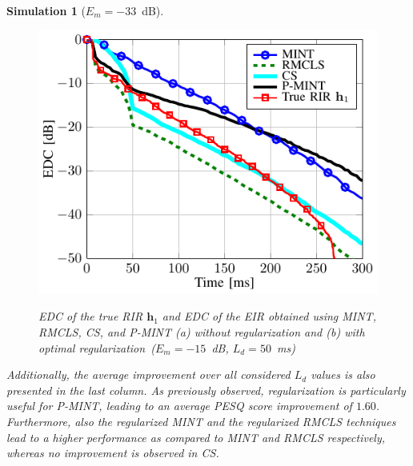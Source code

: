 \documentclass[10pt]{IEEEtran}
\newtheorem{simulation}{Simulation}
\begin{document}
\begin{simulation}[$E_m=-33$~dB]
\begin{figure}[t!]
{{    \includegraphics[scale=0.9]{figures/EDC_noreg_sys_3_Cm_-15_Ld_800.pdf}
  }
  \hspace{2cm}
  }
\caption{EDC of the true RIR $\mathbf{h}_1$ and EDC of the EIR obtained using MINT, RMCLS, CS, and P-MINT (a) without regularization and (b) with optimal regularization~($E_m = -15$~dB, $L_d = 50$~ms)}
\end{figure}
Additionally, the average improvement over all considered $L_d$ values is also presented in the last column.
As previously observed, regularization is particularly useful for P-MINT, leading to an average PESQ score improvement of $1.60$.
Furthermore, also the regularized MINT and the regularized RMCLS techniques lead to a higher performance as compared to MINT and RMCLS respectively, whereas no improvement is observed in CS.
\end{simulation}
\end{document}
